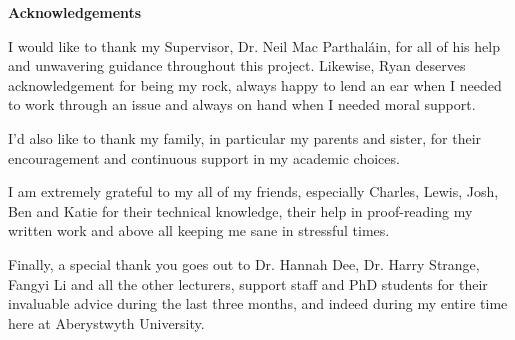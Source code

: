 \thispagestyle{empty}

\begin{center}
    {\LARGE\bf Acknowledgements}
\end{center}

I would like to thank my Supervisor, Dr. Neil Mac Parthal\'ain, for all of his help and unwavering guidance throughout this project. Likewise, Ryan deserves acknowledgement for being my rock, always happy to lend an ear when I needed to work through an issue and always on hand when I needed moral support.

I'd also like to thank my family, in particular my parents and sister, for their encouragement and continuous support in my academic choices.

I am extremely grateful to my all of my friends, especially Charles, Lewis, Josh, Ben and Katie for their technical knowledge, their help in proof-reading my written work and above all keeping me sane in stressful times.

Finally, a special thank you goes out to Dr. Hannah Dee, Dr. Harry Strange, Fangyi Li and all the other lecturers, support staff and PhD students for their invaluable advice during the last three months, and indeed during my entire time here at Aberystwyth University.
